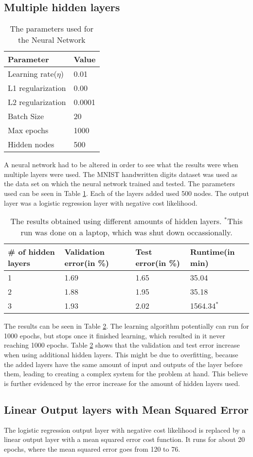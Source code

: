 
\subsection*{Multiple hidden layers}

\begin{table}[!h]
\centering
\begin{tabular}{ll}
\textbf{Parameter}           & \textbf{Value} \\ \hline  
Learning rate($\eta$) & 0.01   \\
L1 regularization   & 0.00   \\
L2 regularization   & 0.0001 \\
Batch Size          & 20     \\
Max epochs          & 1000   \\
Hidden nodes        & 500   
\end{tabular}
\caption{The parameters used for the Neural Network}
\label{parameters1}
\end{table}

A neural network had to be altered in order to see what the results were when multiple layers were used. The MNIST handwritten digits dataset was used as the data set on which the neural network trained and tested. The parameters used can be seen in Table \ref{parameters1}. Each of the layers added used 500 nodes. The output layer was a logistic regression layer with negative cost likelihood.

\begin{table}[!h]
\centering
\begin{tabular}{llll}
\textbf{\# of hidden layers} & \textbf{Validation error(in \%)} & \textbf{Test error(in \%)} & \textbf{Runtime(in min)} \\ \hline
1       &      1.69   &           1.65    & 35.04              \\
2       &      1.88                     &       1.95    &      35.18       \\
3        &       1.93                    &      2.02    &    1564.34$^{*}$       

\end{tabular}
\caption{The results obtained using different amounts of hidden layers. $^*$This run was done on a laptop, which was shut down occassionally.}
\label{results1}
\end{table}

The results can be seen in Table \ref{results1}. The learning algorithm potentially can run for 1000 epochs, but stops once it finished learning, which resulted in it never reaching 1000 epochs. Table \ref{results1} shows that the validation and test error increase when using additional hidden layers. This might be due to overfitting, because the added layers have the same amount of input and outputs of the layer before them, leading to creating a complex system for the problem at hand. This believe is further evidenced by the error increase for the amount of hidden layers used.

\subsection*{Linear Output layers with Mean Squared Error}

The logistic regression output layer with negative cost likelihood is replaced by a linear output layer with a mean squared error cost function. It runs for about 20 epochs, where the mean squared error goes from 120 to 76.
